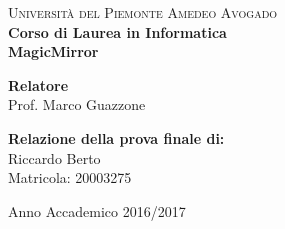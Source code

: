 \begin{titlepage}
\begin{center}

\textsc{\Large Università del Piemonte Amedeo Avogado}\\[0.7cm]

{\normalsize \bf Corso di Laurea in Informatica}\\[1cm]


{\Large \bfseries MagicMirror}\\[1cm]

\begin{minipage}[t]{0.4\textwidth}
\vspace{0.5cm}
\flushleft
{\bf Relatore}\\
Prof. Marco Guazzone\\
\end{minipage}
\begin{minipage}[t]{0.4\textwidth}
  \vspace{2.5cm}
\vfill
\flushright
{\bf Relazione della prova finale di:}\\
Riccardo Berto\\
Matricola: 20003275\\
\end{minipage}
\vfill
\vspace{0.5cm}
{\large Anno Accademico 2016/2017}
\vfill
\end{center}
\end{titlepage}

